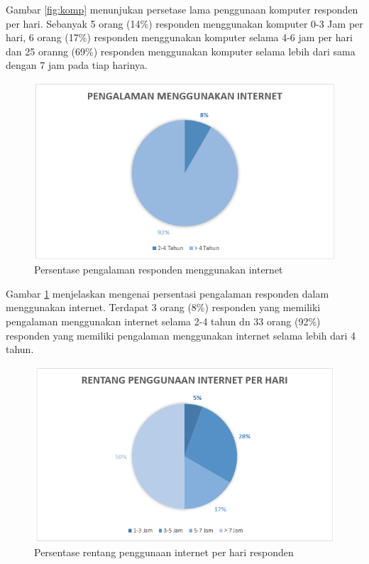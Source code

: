 \noindent
Gambar \ref{fig:komp} menunjukan persetase lama penggunaan komputer responden per hari. Sebanyak 5 orang (14\%) responden menggunakan komputer 0-3 Jam per hari, 6 orang (17\%) responden menggunakan komputer selama 4-6 jam per hari dan 25 oranng (69\%) responden menggunakan komputer selama lebih dari sama dengan 7 jam pada tiap harinya.
\begin{figure}
	\centering
	\includegraphics[width=\textwidth]
	{pics/pengalamanInternet.PNG}
	\caption{Persentase pengalaman responden menggunakan internet}
	\label{fig:lamainet}
\end{figure}
\noindent
Gambar \ref{fig:lamainet} menjelaskan mengenai persentasi pengalaman responden dalam menggunakan internet. Terdapat 3 orang (8\%) responden yang memiliki pengalaman menggunakan internet selama 2-4 tahun dn 33 orang (92\%) responden yang memiliki pengalaman menggunakan internet selama lebih dari 4 tahun.
\begin{figure}
	\centering
	\includegraphics[width=\textwidth]
	{pics/pakeInternetperhari.PNG}
	\caption{Persentase rentang penggunaan internet per hari responden}
	\label{fig:maininet}
\end{figure}
